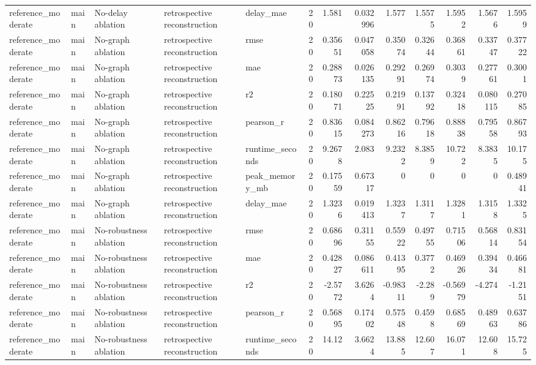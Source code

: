 \begin{table}[!htbp]
{{\begin{tabular}{lllllrrrrrrrr}
reference_moderate & main & No-delay ablation & retrospective reconstruction & delay_mae & 20 & 1.581 & 0.032996 & 1.577 & 1.5575 & 1.5952 & 1.5676 & 1.5959 \\
reference_moderate & main & No-graph ablation & retrospective reconstruction & rmse & 20 & 0.35651 & 0.047058 & 0.35074 & 0.32644 & 0.36861 & 0.33747 & 0.37722 \\
reference_moderate & main & No-graph ablation & retrospective reconstruction & mae & 20 & 0.28873 & 0.026135 & 0.29291 & 0.26974 & 0.3039 & 0.27761 & 0.3001 \\
reference_moderate & main & No-graph ablation & retrospective reconstruction & r2 & 20 & 0.18071 & 0.22525 & 0.21991 & 0.13792 & 0.32418 & 0.080115 & 0.27085 \\
reference_moderate & main & No-graph ablation & retrospective reconstruction & pearson_r & 20 & 0.83615 & 0.084273 & 0.86216 & 0.79618 & 0.88838 & 0.79558 & 0.86793 \\
reference_moderate & main & No-graph ablation & retrospective reconstruction & runtime_seconds & 20 & 9.2678 & 2.083 & 9.2322 & 8.3859 & 10.722 & 8.3835 & 10.175 \\
reference_moderate & main & No-graph ablation & retrospective reconstruction & peak_memory_mb & 20 & 0.17559 & 0.67317 & 0 & 0 & 0 & 0 & 0.48941 \\
reference_moderate & main & No-graph ablation & retrospective reconstruction & delay_mae & 20 & 1.3236 & 0.019413 & 1.3237 & 1.3117 & 1.3281 & 1.3158 & 1.3325 \\
reference_moderate & main & No-robustness ablation & retrospective reconstruction & rmse & 20 & 0.68696 & 0.31155 & 0.55922 & 0.49755 & 0.71506 & 0.56814 & 0.83154 \\
reference_moderate & main & No-robustness ablation & retrospective reconstruction & mae & 20 & 0.42827 & 0.086611 & 0.41395 & 0.3772 & 0.46926 & 0.39434 & 0.46681 \\
reference_moderate & main & No-robustness ablation & retrospective reconstruction & r2 & 20 & -2.5772 & 3.6264 & -0.98311 & -2.289 & -0.56979 & -4.274 & -1.2151 \\
reference_moderate & main & No-robustness ablation & retrospective reconstruction & pearson_r & 20 & 0.56895 & 0.17402 & 0.57548 & 0.4598 & 0.68569 & 0.48963 & 0.63786 \\
reference_moderate & main & No-robustness ablation & retrospective reconstruction & runtime_seconds & 20 & 14.12 & 3.6624 & 13.885 & 12.607 & 16.071 & 12.608 & 15.725 \\

\end{tabular}}}
\end{table}

